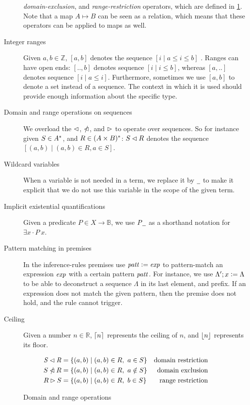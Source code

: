 \begin{description}
  \textit{domain-exclusion}, and \textit{range-restriction} operators, which
  are defined in \cref{fig:domain-and-range-ops}. Note that a map $A \mapsto B$
  can be seen as a relation, which means that these operators can be
  applied to maps as well.
\item[Integer ranges] Given $a, b \in \mathbb{Z}$, $[a, b]$ denotes the
  sequence $[i \mid a \leq i \leq b]$ . Ranges can have open ends: $[.., b]$
  denotes sequence $[i \mid i \leq b]$, whereas $[a, ..]$ denotes sequence
  $[i \mid a \leq i]$. Furthermore, sometimes we use $[a, b]$ to denote a set
  instead of a sequence. The context in which it is used should provide enough
  information about the specific type.
\item[Domain and range operations on sequences] We overload the $\lhd$,
  $\mathbin{\slashed{\lhd}}$, and $\rhd$ to operate over sequences. So for
  instance given $S \in A^{*}$, and $R \in (A \times B)^{*}$:
  $S \lhd R$ denotes the sequence
  $[ (a, b) \mid (a, b) \in R, a \in S]$.
\item[Wildcard variables] When a variable is not needed in a term, we replace
  it by $\wcard$ to make it explicit that we do not use this variable in the
  scope of the given term.
\item[Implicit existential quantifications] Given a predicate
  $P \in X \to \mathbb{B}$, we use $P \wcard$ as a shorthand notation for
  $\exists x \cdot P~x$.

\item[Pattern matching in premises] In the inference-rules premises use
  $\mathit{patt} \mathrel{\mathop:}= \mathit{exp}$ to pattern-match an expression $\mathit{exp} $
  with a certain pattern $\mathit{patt}$. For instance, we use
  $\Lambda'; x \mathrel{\mathop:}= \Lambda$ to be able to deconstruct a sequence $\Lambda$
  in its last element, and prefix. If an expression does not match the given
  pattern, then the premise does not hold, and the rule cannot trigger.

\item[Ceiling] Given a number $n \in \mathbb{R}$, $\lceil n\rceil$ represents the
  ceiling of $n$, and $\lfloor n\rfloor$ represents its floor.
\end{description}

\begin{figure}[htb]
  \begin{align*}
    \mathit{S} \lhd \mathit{R}
    & = \{ (a, b) \mid (a, b) \in R, ~ a \in S \}
    & \text{domain restriction}
    \\
    S \mathbin{\slashed{\lhd}} R
    & = \{ (a, b) \mid (a, b) \in R, ~ a \notin S \}
    & \text{domain exclusion}
    \\
    R \rhd S
    & = \{ (a, b) \mid (a, b) \in R, ~ b \in S \}
    & \text{range restriction}
  \end{align*}
  \caption{Domain and range operations}
  \label{fig:domain-and-range-ops}
\end{figure}